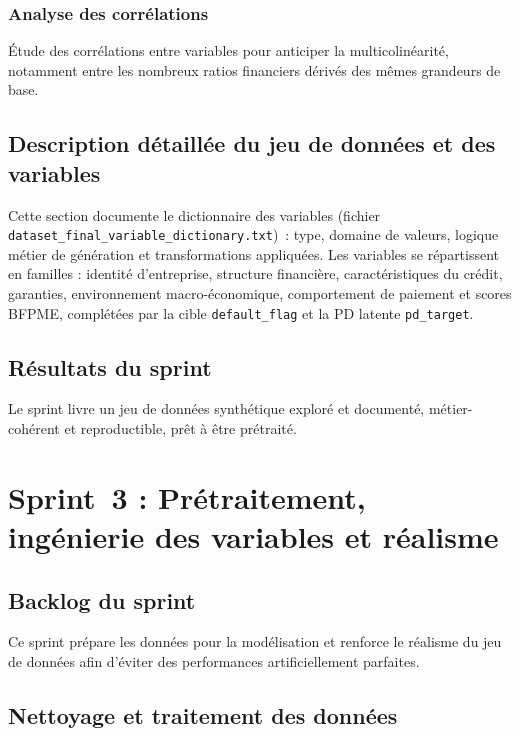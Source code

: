 \documentclass[a4paper,12pt,oneside]{report}
\begin{document}
\subsubsection{Analyse des corrélations}

Étude des corrélations entre variables pour anticiper la multicolinéarité, notamment entre les
nombreux ratios financiers dérivés des mêmes grandeurs de base.

\subsection{Description détaillée du jeu de données et des variables}

Cette section documente le dictionnaire des variables (fichier
\texttt{dataset\_\allowbreak final\_\allowbreak variable\_\allowbreak dictionary.txt})~:
type, domaine de valeurs, logique métier de génération et transformations appliquées. Les
variables se répartissent en familles : identité d'entreprise, structure financière,
caractéristiques du crédit, garanties, environnement macro-économique, comportement de paiement
et scores BFPME, complétées par la cible \texttt{default\_flag} et la PD latente
\texttt{pd\_target}.

\subsection{Résultats du sprint}

Le sprint livre un jeu de données synthétique exploré et documenté, métier-cohérent et
reproductible, prêt à être prétraité.

\section{Sprint~3 : Prétraitement, ingénierie des variables et réalisme}

\subsection{Backlog du sprint}

Ce sprint prépare les données pour la modélisation et renforce le réalisme du jeu de données
afin d'éviter des performances artificiellement parfaites.

\subsection{Nettoyage et traitement des données}
\end{document}
